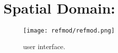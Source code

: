 \chapter{Spatial Domain: }
\label{ch:ref-mod}


\begin{figure*}[]
  \texttt{[image: refmod/refmod.png]}
  \caption[Tempo Transition]{ user interface.}
  \label{fig:basic-tempo-change}
\end{figure*}



